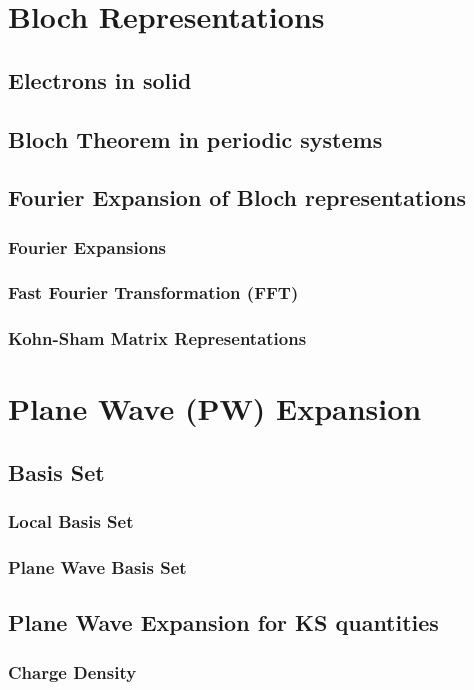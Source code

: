 \section{Bloch Representations}
    \subsection{Electrons in solid}
    \subsection{Bloch Theorem in periodic systems}
    \subsection{Fourier Expansion of Bloch representations}
        \subsubsection{Fourier Expansions}
        \subsubsection{Fast Fourier Transformation (FFT)}
        \subsubsection{Kohn-Sham Matrix Representations}
\section{Plane Wave (PW) Expansion}
    \subsection{Basis Set}
        \subsubsection{Local Basis Set}
        \subsubsection{Plane Wave Basis Set}
    \subsection{Plane Wave Expansion for KS quantities}
        \subsubsection{Charge Density}
